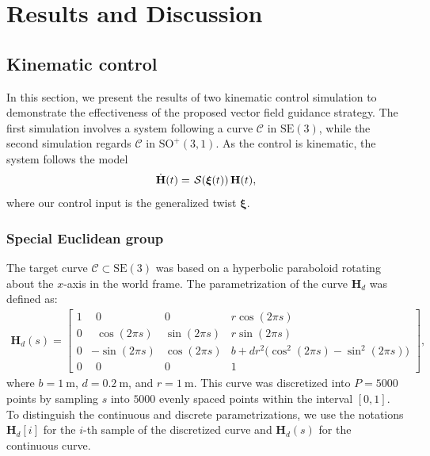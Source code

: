 \chapter{Results and Discussion}\label{ch:results}
\section{Kinematic control}
In this section, we present the results of two kinematic control simulation to demonstrate the effectiveness of the proposed vector field guidance strategy. The first simulation involves a system following a curve $\mathcal{C}$ in $\text{SE}(3)$, while the second simulation regards $\mathcal{C}$ in $\text{SO}^+(3, 1)$. As the control is kinematic, the system follows the model
\begin{align}
    \dot{\mathbf{H}}(t) = \SL[\boldsymbol{\xi}(t)]\mathbf{H}(t),
\end{align}
where our control input is the generalized twist $\boldsymbol{\xi}$.
\subsection{Special Euclidean group}
The target curve $\mathcal{C}\subset\text{SE}(3)$ was based on a hyperbolic paraboloid rotating about the $x$-axis in the world frame. The parametrization of the curve $\mathbf{H}_d$ was defined as:
\begin{align}
    \mathbf{H}_d(s) = \begin{bmatrix}
        1 & \ \ 0 & 0 & r\cos(2\pi s)\\
        0 & \ \ \cos(2\pi s) & \sin(2\pi s) & r\sin(2\pi s)\\
        0 & -\sin(2\pi s) & \cos(2\pi s) & b + dr^2\bigl(\cos^2(2\pi s) - \sin^2(2\pi s)\bigr)\\
        0 & \ \ 0 & 0 & 1
    \end{bmatrix},
\end{align}
where $b=\qty{1}{\meter}$, $d=\qty{0.2}{\meter}$, and $r=\qty{1}{\meter}$. This curve was discretized into $P=\num{5000}$ points by sampling $s$ into $\num{5000}$ evenly spaced points within the interval $[0, 1]$. To distinguish the continuous and discrete parametrizations, we use the notations $\mathbf{H}_d[i]$ for the $i$-th sample of the discretized curve and $\mathbf{H}_d(s)$ for the continuous curve.
